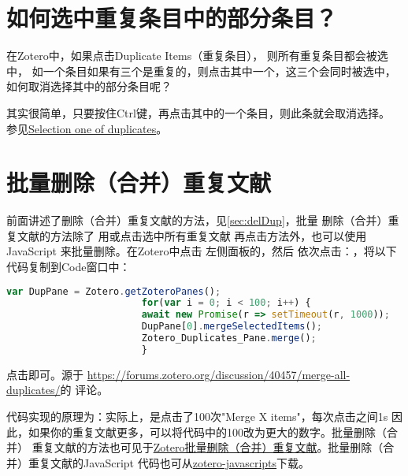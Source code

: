 \documentclass[cn,11pt,chinese]{elegantbook}
\begin{document}
		\section{如何选中重复条目中的部分条目？}\label{sec:selectDup}	
			在Zotero中，如果点击Duplicate Items（重复条目），
			则所有重复条目都会被选中，
			如一个条目如果有三个是重复的，则点击其中一个，这三个会同时被选中，
			如何取消选择其中的部分条目呢？

			其实很简单，只要按住Ctrl键，再点击其中的一个条目，则此条就会取消选择。
			参见\href{https://forums.zotero.org/discussion/91561/selection-one-of-duplicates}{Selection one of duplicates}。

			 
		\section{批量删除（合并）重复文献}\label{sec:DelDupBatch}				
			 	前面讲述了删除（合并）重复文献的方法，见\cref{sec:delDup}，批量
				 删除（合并）重复文献的方法除了
				 用或点击选中所有重复文献
				 再点击方法外，也可以使用JavaScript
				 来批量删除。在Zotero中点击
				 左侧面板的，然后
				 依次点击：，将以下代码复制到Code窗口中：

					\begin{lstlisting}[language=JavaScript]
						var DupPane = Zotero.getZoteroPanes();
						for(var i = 0; i < 100; i++) {
						await new Promise(r => setTimeout(r, 1000));
						DupPane[0].mergeSelectedItems();
						Zotero_Duplicates_Pane.merge();
						}
					\end{lstlisting}
				点击即可。源于
				\url{https://forums.zotero.org/discussion/40457/merge-all-duplicates/}的
				评论。

				代码实现的原理为：实际上，是点击了100次"Merge X items"，每次点击之间1s
				因此，如果你的重复文献更多，可以将代码中的100改为更大的数字。批量删除（合并）
				重复文献的方法也可见于\href{https://zhuanlan.zhihu.com/p/352324486}
				{Zotero批量删除（合并）重复文献}。批量删除（合并）重复文献的JavaScript
				代码也可从\href{https://github.com/redleafnew/zotero-javascripts}
				{zotero-javascripts}下载。
\end{document}
